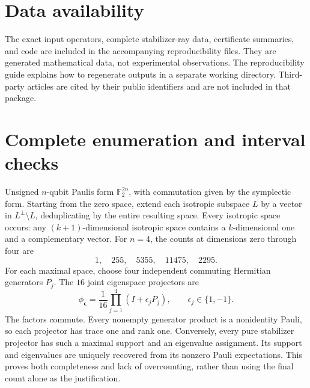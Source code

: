 \documentclass[aps,pra,reprint,amsmath,amssymb,longbibliography,nofootinbib]{revtex4-2}
\begin{document}
\section*{Data availability}
The exact input operators, complete stabilizer-ray data, certificate summaries, and code are included in the accompanying reproducibility files. They are generated mathematical data, not experimental observations. The reproducibility guide explains how to regenerate outputs in a separate working directory. Third-party articles are cited by their public identifiers and are not included in that package.

\appendix
\section{Complete enumeration and interval checks}
\label{app:enumeration}

Unsigned $n$-qubit Paulis form $\mathbb F_2^{2n}$, with commutation given by the symplectic form. Starting from the zero space, extend each isotropic subspace $L$ by a vector in $L^\perp\setminus L$, deduplicating by the entire resulting space. Every isotropic space occurs: any $(k+1)$-dimensional isotropic space contains a $k$-dimensional one and a complementary vector. For $n=4$, the counts at dimensions zero through four are
\begin{equation}
 1,\quad255,\quad5355,\quad11475,\quad2295.
 \label{eq:counts}
\end{equation}
For each maximal space, choose four independent commuting Hermitian generators $P_j$. The $16$ joint eigenspace projectors are
\begin{equation}
 \phi_{\bm\epsilon}=\frac1{16}\prod_{j=1}^4(I+\epsilon_jP_j),
 \qquad\epsilon_j\in\{1,-1\}.
 \label{eq:projector-enum}
\end{equation}
The factors commute. Every nonempty generator product is a nonidentity Pauli, so each projector has trace one and rank one. Conversely, every pure stabilizer projector has such a maximal support and an eigenvalue assignment. Its support and eigenvalues are uniquely recovered from its nonzero Pauli expectations. This proves both completeness and lack of overcounting, rather than using the final count alone as the justification.
\end{document}
